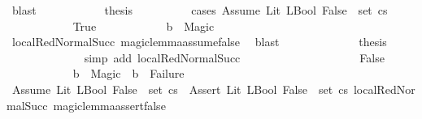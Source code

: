 \begin{isabellebody}
\ blast\isanewline
\ \ \ \ \ \ \ \ \isamarkupfalse%
\ \isamarkupfalse%
\ {\isacharquery}{\kern0pt}thesis\isanewline
\ \ \ \ \ \ \ \ \isamarkupfalse%
\ {\isacharparenleft}{\kern0pt}cases\ {\isachardoublequoteopen}{\isacharparenleft}{\kern0pt}Assume\ {\isacharparenleft}{\kern0pt}Lit\ {\isacharparenleft}{\kern0pt}LBool\ False{\isacharparenright}{\kern0pt}{\isacharparenright}{\kern0pt}{\isacharparenright}{\kern0pt}\ {\isasymin}\ set\ {\isacharparenleft}{\kern0pt}cs{\isacharparenright}{\kern0pt}{\isachardoublequoteclose}{\isacharparenright}{\kern0pt}\isanewline
\ \ \ \ \ \ \ \ \ \ \isamarkupfalse%
\ True\isanewline
\ \ \ \ \ \ \ \ \ \ \isamarkupfalse%
\ {\isachardoublequoteopen}b\ {\isacharequal}{\kern0pt}\ Magic{\isachardoublequoteclose}\isanewline
\ \ \ \ \ \ \ \ \ \ \ \ \isamarkupfalse%
\ local{\isachardot}{\kern0pt}RedNormalSucc{\isacharparenleft}{\kern0pt}{}{\isacharparenright}{\kern0pt}\ magic{\isacharunderscore}{\kern0pt}lemma{\isacharunderscore}{\kern0pt}assume{\isacharunderscore}{\kern0pt}false\ \isamarkupfalse%
\ blast\isanewline
\ \ \ \ \ \ \ \ \ \ \isamarkupfalse%
\ \isamarkupfalse%
\ {\isacharquery}{\kern0pt}thesis\isanewline
\ \ \ \ \ \ \ \ \ \ \ \ \isamarkupfalse%
\ {\isacharparenleft}{\kern0pt}simp\ add{\isacharcolon}{\kern0pt}\ local{\isachardot}{\kern0pt}RedNormalSucc{\isacharparenleft}{\kern0pt}{}{\isacharparenright}{\kern0pt}{\isacharparenright}{\kern0pt}\isanewline
\ \ \ \ \ \ \ \ \isamarkupfalse%
\isanewline
\ \ \ \ \ \ \ \ \ \ \isamarkupfalse%
\ False\isanewline
\ \ \ \ \ \ \ \ \ \ \isamarkupfalse%
\ {\isachardoublequoteopen}b\ {\isacharequal}{\kern0pt}\ Magic\ {\isasymor}\ b\ {\isacharequal}{\kern0pt}\ Failure{\isachardoublequoteclose}\isanewline
\ \ \ \ \ \ \ \ \ \ \ \ \isamarkupfalse%
\ {\isacartoucheopen}Assume\ {\isacharparenleft}{\kern0pt}Lit\ {\isacharparenleft}{\kern0pt}LBool\ False{\isacharparenright}{\kern0pt}{\isacharparenright}{\kern0pt}\ {\isasymin}\ set\ cs\ {\isasymor}\ Assert\ {\isacharparenleft}{\kern0pt}Lit\ {\isacharparenleft}{\kern0pt}LBool\ False{\isacharparenright}{\kern0pt}{\isacharparenright}{\kern0pt}\ {\isasymin}\ set\ cs{\isacartoucheclose}\ local{\isachardot}{\kern0pt}RedNormalSucc{\isacharparenleft}{\kern0pt}{}{\isacharparenright}{\kern0pt}\ magic{\isacharunderscore}{\kern0pt}lemma{\isacharunderscore}{\kern0pt}assert{\isacharunderscore}{\kern0pt}false\ \isanewline

\end{isabellebody}
